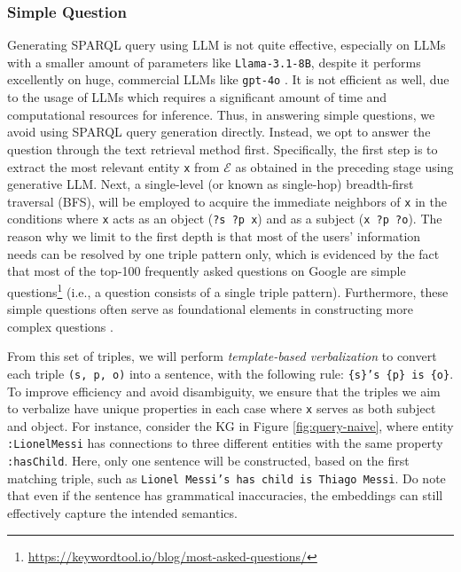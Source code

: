 \subsubsection{Simple Question} \label{local-question}
Generating SPARQL query using LLM is not quite effective, especially on LLMs with a smaller amount of parameters like \texttt{Llama-3.1-8B}, despite it performs excellently on huge, commercial LLMs like \texttt{gpt-4o} \citep{emonet2024llmbasedsparqlquerygeneration}. It is not efficient as well, due to the usage of LLMs which requires a significant amount of time and computational resources for inference. Thus, in answering simple questions, we avoid using SPARQL query generation directly. Instead, we opt to answer the question through the text retrieval method first. Specifically, the first step is to extract the most relevant entity \texttt{x} from $\mathcal{E}$ as obtained in the preceding stage using generative LLM. Next, a single-level (or known as single-hop) breadth-first traversal (BFS), will be employed to acquire the immediate neighbors of \texttt{x} in the conditions where \texttt{x} acts as an object (\texttt{?s ?p x}) and as a subject (\texttt{x ?p ?o}). The reason why we limit to the first depth is that most of the users' information needs can be resolved by one triple pattern only, which is evidenced by the fact that most of the top-100 frequently asked questions on Google are simple questions\footnote{\url{https://keywordtool.io/blog/most-asked-questions/}} (i.e., a question consists of a single triple pattern). Furthermore, these simple questions often serve as foundational elements in constructing more complex questions \citep{simpleqa}.

From this set of triples, we will perform \textit{template-based verbalization} to convert each triple \texttt{(s, p, o)} into a sentence, with the following rule: \texttt{\{s\}'s \{p\} is \{o\}}. To improve efficiency and avoid disambiguity, we ensure that the triples we aim to verbalize have unique properties in each case where \texttt{x} serves as both subject and object. For instance, consider the KG in Figure \ref{fig:query-naive}, where entity \texttt{:LionelMessi} has connections to three different entities with the same property \texttt{:hasChild}. Here, only one sentence will be constructed, based on the first matching triple, such as \texttt{Lionel Messi's has child is Thiago Messi}. Do note that even if the sentence has grammatical inaccuracies, the embeddings can still effectively capture the intended semantics.

